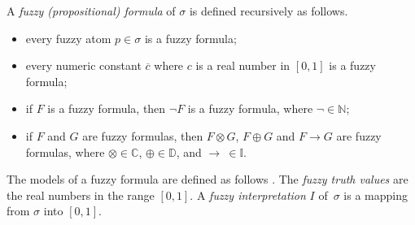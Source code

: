 \documentclass[runningheads]{llncs}
\def\rar{\rightarrow}
\def\fand{\otimes}
\def\for{\oplus}
\def\fneg{\neg}
\def\frar{\rar}
\begin{document}
A {\em fuzzy (propositional) formula} of $\sigma$ is defined recursively as
follows.
%
\begin{itemize}
\item every fuzzy atom $p\in\sigma$ is a fuzzy formula;

\item every numeric constant $\overline{c}$ where $c$ is a real number in
  $[0, 1]$ is a fuzzy formula;

\item if $F$ is a fuzzy formula, then $\fneg F$ is a fuzzy formula, where $\fneg \in
  \mathbb{N}$;

\item if $F$ and $G$ are fuzzy formulas, then $F\fand G$, $F\for G$
  and $F\frar G$ are fuzzy formulas, where $\fand\in\mathbb{C}$,
  $\for\in\mathbb{D}$, and $\frar\ \in\mathbb{I}$.
\end{itemize}

The models of a fuzzy formula are defined as follows
\cite{hajek98mathematics}.
%
The {\em fuzzy truth values} are the real numbers in the range $\left[0,
  1\right]$. 
A \emph{fuzzy interpretation} $I$ of~$\sigma$ is a mapping
from $\sigma$ into $\left[0, 1\right]$.
\end{document}
